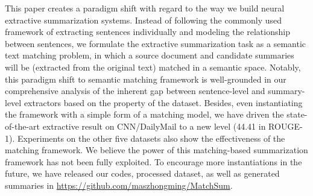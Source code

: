 This paper creates a paradigm shift with regard to the way we build neural extractive summarization systems. Instead of following the commonly used framework of extracting sentences individually and modeling the relationship between sentences, we formulate the extractive summarization task as a semantic text matching problem, in which a source document and candidate summaries will be (extracted from the original text) matched in a semantic space. Notably, this paradigm shift to semantic matching framework is well-grounded in our comprehensive analysis of the inherent gap between sentence-level and summary-level extractors based on the property of the dataset. Besides, even instantiating the framework with a simple form of a matching model, we have driven the state-of-the-art extractive result on CNN/DailyMail to a new level (44.41 in ROUGE-1). Experiments on the other five datasets also show the effectiveness of the matching framework. We believe the power of this matching-based summarization framework has not been fully exploited. To encourage more instantiations in the future, we have released our codes, processed dataset, as well as generated summaries in {\url{https://github.com/maszhongming/MatchSum}}.
